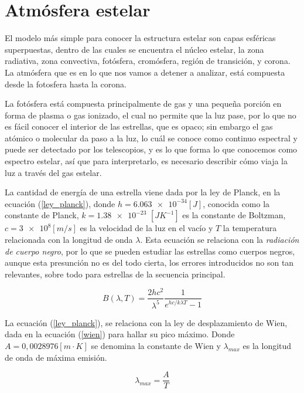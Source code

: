 \documentclass[12pt,oneside,openany,letter]{book}
\begin{document}
\section{Atmósfera estelar}\label{sec:atm_est}
El modelo más simple para conocer la estructura estelar son capas esféricas superpuestas, dentro de las cuales se encuentra el núcleo estelar, la zona radiativa, zona convectiva, fotósfera, cromósfera, región de transición, y corona. La atmósfera que es en lo que nos vamos a detener a analizar, está compuesta desde la fotosfera hasta la corona. 
\vspace{2mm}

\noindent La fotósfera está compuesta principalmente de gas y una pequeña porción en forma de plasma o gas ionizado, el cual no permite que la luz pase, por lo que no es fácil conocer el interior de las estrellas, que es opaco; sin embargo el gas atómico o molecular da paso a la luz, lo cuál se conoce como continuo espectral y puede ser detectado por los telescopios, y es lo que forma lo que conocemos como espectro estelar, así que para interpretarlo, es necesario describir cómo viaja la luz a través del gas estelar. 



\noindent La cantidad de energía de una estrella viene dada por la ley de Planck, en la ecuación (\ref{ley_planck}), donde $h = \num{6.063e-34} [J]$, conocida como la constante de Planck, $k = \num{1.38e-23}$ $[JK^{-1}]$ es la constante de Boltzman, $c= \num{3e8} [m/s]$ es la velocidad de la luz en el vacío y $T$ la temperatura relacionada con la longitud de onda $\lambda$. Esta ecuación se relaciona con la \textit{radiación de cuerpo negro}, por lo que se pueden estudiar las estrellas como cuerpos negros, aunque esta presunción no es del todo cierta, los errores introducidos no son tan relevantes, sobre todo para estrellas de la secuencia principal.

\begin{equation}
    B(\lambda,T) = \frac{2h c^2}{\lambda^5} \frac{1}{e^{h c/k\lambda T}-1}
    \label{ley_planck}
\end{equation}

\noindent La ecuación (\ref{ley_planck}), se relaciona con la ley de desplazamiento de Wien, dada en la ecuación (\ref{wien}) para hallar su pico máximo. Donde $A = 0,0028976 [m\cdot K]$ se denomina la constante de Wien y $\lambda_{max}$ es la longitud de onda de máxima emisión.

\begin{equation}
    \lambda_{max} =  \frac{A}{T}
    \label{wien}
\end{equation}
\end{document}
